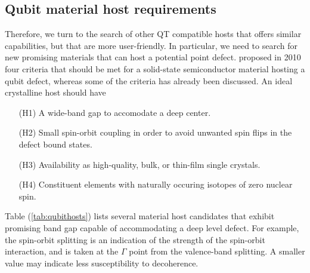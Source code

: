 \subsection{Qubit material host requirements}
\label{ssec:qubit-material-host-requirements}
Therefore, we turn to the search of other QT compatible hosts that offers similar capabilities, but that are more user-friendly. In particular, we need to search for new promising materials that can host a potential point defect. \citeauthor{Weber2010} \cite{Weber2010} proposed in 2010 four criteria that should be met for a solid-state semiconductor material hosting a qubit defect, whereas some of the criteria has already been discussed. An ideal crystalline host should have \cite{Weber2010}
\begin{itemize}
  \item[(H1)] A wide-band gap to accomodate a deep center.
  \item[(H2)] Small spin-orbit coupling in order to avoid unwanted spin flips in the defect bound states.
  \item[(H3)] Availability as high-quality, bulk, or thin-film single crystals.
  \item[(H4)] Constituent elements with naturally occuring isotopes of zero nuclear spin.
\end{itemize}


\noindent Table (\autoref{tab:qubithosts}) lists several material host candidates that exhibit promising band gap capable of accommodating a deep level defect. For example, the spin-orbit splitting is an indication of the strength of the spin-orbit interaction, and is taken at the $\Gamma$ point from the valence-band splitting. A smaller value may indicate less susceptibility to decoherence.

